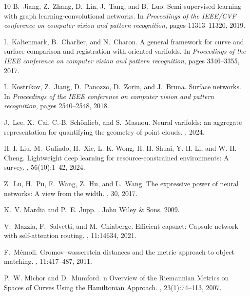 \documentclass[11pt]{article}
\begin{document}
\begin{thebibliography}{10}
B.~Jiang, Z.~Zhang, D.~Lin, J.~Tang, and B.~Luo.
\newblock Semi-supervised learning with graph learning-convolutional networks.
\newblock In {\em Proceedings of the IEEE/CVF conference on computer vision and pattern recognition}, pages 11313--11320, 2019.

I.~Kaltenmark, B.~Charlier, and N.~Charon.
\newblock A general framework for curve and surface comparison and registration with oriented varifolds.
\newblock In {\em Proceedings of the IEEE conference on computer vision and pattern recognition}, pages 3346--3355, 2017.

I.~Kostrikov, Z.~Jiang, D.~Panozzo, D.~Zorin, and J.~Bruna.
\newblock Surface networks.
\newblock In {\em Proceedings of the IEEE conference on computer vision and pattern recognition}, pages 2540--2548, 2018.

J.~Lee, X.~Cai, C.-B. Sch{\"o}nlieb, and S.~Masnou.
\newblock Neural varifolds: an aggregate representation for quantifying the geometry of point clouds.
, 2024.

H.-I. Liu, M.~Galindo, H.~Xie, L.-K. Wong, H.-H. Shuai, Y.-H. Li, and W.-H. Cheng.
\newblock Lightweight deep learning for resource-constrained environments: A survey.
, 56(10):1--42, 2024.

Z.~Lu, H.~Pu, F.~Wang, Z.~Hu, and L.~Wang.
\newblock The expressive power of neural networks: A view from the width.
, 30, 2017.

K.~V. Mardia and P.~E. Jupp.
.
\newblock John Wiley \& Sons, 2009.

V.~Mazzia, F.~Salvetti, and M.~Chiaberge.
\newblock Efficient-capsnet: Capsule network with self-attention routing.
, 11:14634, 2021.

F.~M{\'e}moli.
\newblock Gromov--wasserstein distances and the metric approach to object matching.
, 11:417--487, 2011.

P.~W. Michor and D.~Mumford.
n {O}verview of the {R}iemannian {M}etrics on {S}paces of {C}urves {U}sing the {H}amiltonian {A}pproach.
, 23(1):74–113, 2007.


\end{thebibliography}
\end{document}
